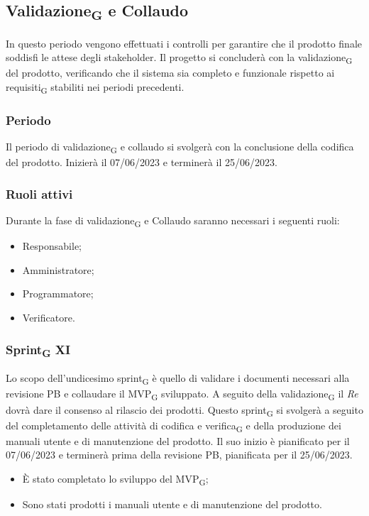 \newpage
\subsection{Validazione\textsubscript{G} e Collaudo}
In questo periodo vengono effettuati i controlli per garantire che il prodotto finale soddisfi le attese degli stakeholder. Il progetto si concluderà con la validazione\textsubscript{G} del prodotto, verificando che il sistema sia completo e funzionale rispetto ai requisiti\textsubscript{G} stabiliti nei periodi precedenti.

\subsubsection{Periodo}
Il periodo di validazione\textsubscript{G} e collaudo si svolgerà con la conclusione della codifica del prodotto. Inizierà il 07/06/2023 e terminerà il 25/06/2023.

\subsubsection{Ruoli attivi}
Durante la fase di validazione\textsubscript{G} e Collaudo saranno necessari i seguenti ruoli:
\begin{itemize}
	\item Responsabile;
	\item Amministratore;
	\item Programmatore;
	\item Verificatore.
\end{itemize}

\subsubsection{Sprint\textsubscript{G} XI}
Lo scopo dell'undicesimo sprint\textsubscript{G} è quello di validare i documenti necessari alla revisione PB e collaudare il MVP\textsubscript{G} sviluppato. A seguito della validazione\textsubscript{G} il \textit{Re} dovrà dare il consenso al rilascio dei prodotti.
Questo sprint\textsubscript{G} si svolgerà a seguito del completamento delle attività di codifica e verifica\textsubscript{G} e della produzione dei manuali utente e di manutenzione del prodotto. Il suo inizio è pianificato per il 07/06/2023 e terminerà prima della revisione PB, pianificata per il 25/06/2023.

\:
\begin{itemize}
	\item È stato completato lo sviluppo del MVP\textsubscript{G};
	\item Sono stati prodotti i manuali utente e di manutenzione del prodotto.
\end{itemize}

